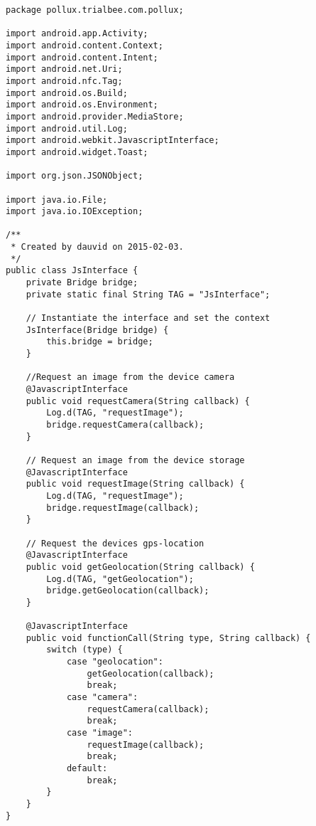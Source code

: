 \begin{lstlisting}
package pollux.trialbee.com.pollux;

import android.app.Activity;
import android.content.Context;
import android.content.Intent;
import android.net.Uri;
import android.nfc.Tag;
import android.os.Build;
import android.os.Environment;
import android.provider.MediaStore;
import android.util.Log;
import android.webkit.JavascriptInterface;
import android.widget.Toast;

import org.json.JSONObject;

import java.io.File;
import java.io.IOException;

/**
 * Created by dauvid on 2015-02-03.
 */
public class JsInterface {  
    private Bridge bridge;
    private static final String TAG = "JsInterface";

    // Instantiate the interface and set the context
    JsInterface(Bridge bridge) {
        this.bridge = bridge;
    }

    //Request an image from the device camera
    @JavascriptInterface
    public void requestCamera(String callback) {
        Log.d(TAG, "requestImage");
        bridge.requestCamera(callback);
    }

    // Request an image from the device storage
    @JavascriptInterface
    public void requestImage(String callback) {
        Log.d(TAG, "requestImage");
        bridge.requestImage(callback);
    }

    // Request the devices gps-location
    @JavascriptInterface
    public void getGeolocation(String callback) {
        Log.d(TAG, "getGeolocation");
        bridge.getGeolocation(callback);
    }

    @JavascriptInterface
    public void functionCall(String type, String callback) {
        switch (type) {
            case "geolocation":
                getGeolocation(callback);
                break;
            case "camera":
                requestCamera(callback);
                break;
            case "image":
                requestImage(callback);
                break;
            default:
                break;
        }
    }
}
\end{lstlisting}

